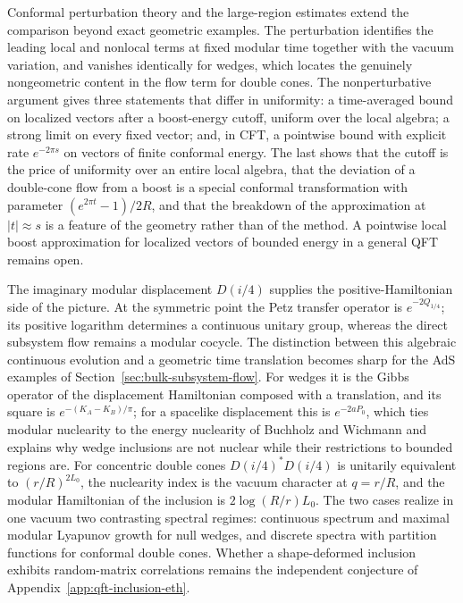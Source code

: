 \documentclass[a4paper,11pt]{article}
\theoremstyle{definition}
\begin{document}
Conformal perturbation theory and the large-region estimates extend the comparison beyond exact geometric examples. The perturbation identifies the leading local and nonlocal terms at fixed modular time together with the vacuum variation, and vanishes identically for wedges, which locates the genuinely nongeometric content in the flow term for double cones. The nonperturbative argument gives three statements that differ in uniformity: a time-averaged bound on localized vectors after a boost-energy cutoff, uniform over the local algebra; a strong limit on every fixed vector; and, in CFT, a pointwise bound with explicit rate $e^{-2\pi s}$ on vectors of finite conformal energy. The last shows that the cutoff is the price of uniformity over an entire local algebra, that the deviation of a double-cone flow from a boost is a special conformal transformation with parameter $(e^{2\pi t}-1)/2R$, and that the breakdown of the approximation at $|t|\approx s$ is a feature of the geometry rather than of the method. A pointwise local boost approximation for localized vectors of bounded energy in a general QFT remains open.

The imaginary modular displacement $D(i/4)$ supplies the positive-Hamiltonian side of the picture. At the symmetric point the Petz transfer operator is $e^{-2Q_{1/4}}$; its positive logarithm determines a continuous unitary group, whereas the direct subsystem flow remains a modular cocycle. The distinction between this algebraic continuous evolution and a geometric time translation becomes sharp for the AdS examples of Section~\ref{sec:bulk-subsystem-flow}. For wedges it is the Gibbs operator of the displacement Hamiltonian composed with a translation, and its square is $e^{-(K_A-K_B)/\pi}$; for a spacelike displacement this is $e^{-2aP_0}$, which ties modular nuclearity to the energy nuclearity of Buchholz and Wichmann and explains why wedge inclusions are not nuclear while their restrictions to bounded regions are. For concentric double cones $D(i/4)^*D(i/4)$ is unitarily equivalent to $(r/R)^{2L_0}$, the nuclearity index is the vacuum character at $q=r/R$, and the modular Hamiltonian of the inclusion is $2\log(R/r)L_0$. The two cases realize in one vacuum two contrasting spectral regimes: continuous spectrum and maximal modular Lyapunov growth for null wedges, and discrete spectra with partition functions for conformal double cones. Whether a shape-deformed inclusion exhibits random-matrix correlations remains the independent conjecture of Appendix~\ref{app:qft-inclusion-eth}.
\end{document}
